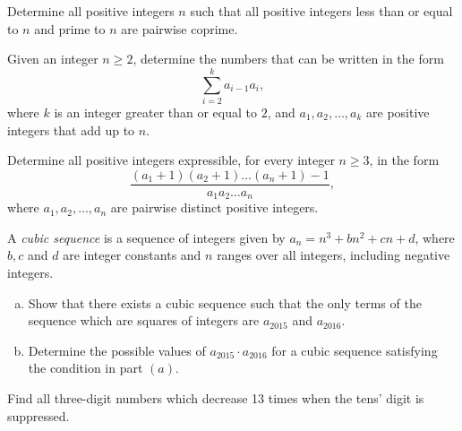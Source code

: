\documentclass[problems.tex]{subfile}
\begin{document}
	
	\begin{problem}
		Determine all positive integers $n$ such that all positive integers less than or equal to $n$ and prime to $n$ are pairwise coprime.
	\end{problem}
	
	
	\begin{problem}
		Given an integer $n \geq 2$, determine the numbers that can be written in
		the form $$ \sum_{i=2}^{k} a_{i-1}a_i,$$ where $k$ is an integer greater than or equal to $2$, and $a_1,a_2,\dots, a_k$ are positive integers that add up to $n$.
	\end{problem}
	
	
	\begin{problem}
		Determine all positive integers expressible, for every integer $n \geq 3$,
		in the form $$\frac{(a_1 + 1)(a_2 + 1) \dots (a_n + 1) - 1}{a_1a_2\dots a_n},$$ where $a_1, a_2, \dots, a_n$ are pairwise distinct positive integers.
	\end{problem}
	
	
	
	\begin{problem}
		A \textit{cubic sequence} is a sequence of integers given by $a_n =n^3 + bn^2 + cn + d$, where $b, c$ and $d$ are integer constants and $n$ ranges over all integers, including negative integers.
		\begin{enumerate}[(a)]
			\item Show that there exists a cubic sequence such that the only terms
			of the sequence which are squares of integers are $a_{2015}$ and $a_{2016}$.
			\item Determine the possible values of $a_{2015} \cdot a_{2016}$ for a cubic sequence
			satisfying the condition in part $(a)$.
		\end{enumerate}
	\end{problem}
	
	
	\begin{problem}
		Find all three-digit numbers which decrease 13 times when the tens'	digit is suppressed.
	\end{problem}
	
\end{document}
